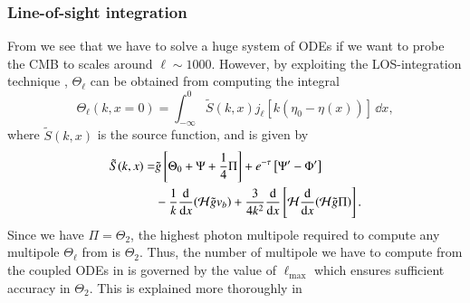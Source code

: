 \subsubsection{Line-of-sight integration}\label{sssec:M3:theory:line_of_sight_integration}
From  we see that we have to solve a huge system of ODEs if we want to probe the CMB to scales around $\ell\sim1000$. However, by exploiting the LOS-integration technique , $\Theta_\ell$ can be obtained from computing the integral 
\begin{equation} \label{eq:M3:theory:Theta_ell_LOS_integration}
    \Theta_\ell(k,x=0) = \int_{-\infty}^0 \tilde{S}(k,x) j_\ell [k(\eta_0 - \eta(x))]\,\dd x, 
\end{equation}
where $\tilde{S}(k,x)$ is the source function, and is given by 
\begin{equation} \label{eq:M3:theory:source_function_LOS}
    \begin{split}
        \tilde{S}(k,x) =& \tilde{g} \left[ \Theta_0 + \Psi + \frac{1}{4} \Pi \right] + e^{-\tau}\left[ \Psi' - \Phi' \right] \\
        & - \frac{1}{k}\dv{x}(\mathcal{H} \tilde{g} v_b) + \frac{3}{4k^2}\dv{x}\left[ \mathcal{H} \dv{x}(\mathcal{H}\tilde{g}\Pi) \right].
    \end{split}
\end{equation}
Since we have $\Pi=\Theta_2$, the highest photon multipole required to compute any multipole $\Theta_\ell$ from  is $\Theta_2$. Thus, the number of multipole we have to compute from the coupled ODEs in  is governed by the value of $\ell_\mathrm{max}$ which ensures sufficient accuracy in $\Theta_2$. This is explained more thoroughly in   